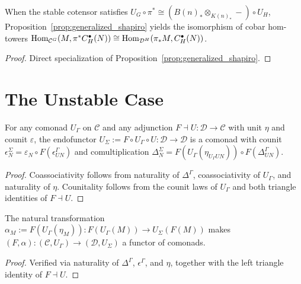 \begin{theorem}
  \label{thm:stable_cor}
  \leanok
  When the stable cotensor satisfies $U_G \circ \pi^* \cong (B(n)_* \otimes_{K(n)_*} -) \circ U_H$, Proposition~\ref{prop:generalized_shapiro} yields the isomorphism of cobar hom-towers $\operatorname{Hom}_{\mathcal{C}^G}(M, \pi^* C^{\bullet}_H(N)) \cong \operatorname{Hom}_{\mathcal{D}^H}(\pi_* M, C^{\bullet}_H(N))$.
\end{theorem}
\begin{proof}
  \leanok
  Direct specialization of Proposition~\ref{prop:generalized_shapiro}.
\end{proof}

\section{The Unstable Case}

\begin{theorem}
  \label{thm:unstable_sigma_comonad}
  \leanok
  For any comonad $U_{\Gamma}$ on $\mathcal{C}$ and any adjunction $F \dashv U : \mathcal{D} \to \mathcal{C}$ with unit $\eta$ and counit $\varepsilon$, the endofunctor $U_{\Sigma} := F \circ U_{\Gamma} \circ U : \mathcal{D} \to \mathcal{D}$ is a comonad with counit $\epsilon^{\Sigma}_N = \varepsilon_N \circ F(\epsilon^{\Gamma}_{UN})$ and comultiplication $\Delta^{\Sigma}_N = F(U_{\Gamma}(\eta_{U_{\Gamma} UN})) \circ F(\Delta^{\Gamma}_{UN})$.
\end{theorem}
\begin{proof}
  \leanok
  Coassociativity follows from naturality of $\Delta^{\Gamma}$, coassociativity of $U_{\Gamma}$, and naturality of $\eta$. Counitality follows from the counit laws of $U_{\Gamma}$ and both triangle identities of $F \dashv U$.
\end{proof}

\begin{theorem}
  \label{thm:unstable_alpha}
  \leanok
  The natural transformation $\alpha_M := F(U_{\Gamma}(\eta_M)) : F(U_{\Gamma}(M)) \to U_{\Sigma}(F(M))$ makes $(F, \alpha) : (\mathcal{C}, U_{\Gamma}) \to (\mathcal{D}, U_{\Sigma})$ a functor of comonads.
\end{theorem}
\begin{proof}
  \leanok
  Verified via naturality of $\Delta^{\Gamma}$, $\epsilon^{\Gamma}$, and $\eta$, together with the left triangle identity of $F \dashv U$.
\end{proof}

